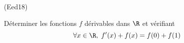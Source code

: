 \begin{tiny}(Eed18)\end{tiny} Déterminer les fonctions $f$ dérivables dans $\R$ et vérifiant
\begin{displaymath}
  \forall x\in \R, \; f'(x) + f(x) = f(0) + f(1)
\end{displaymath}
